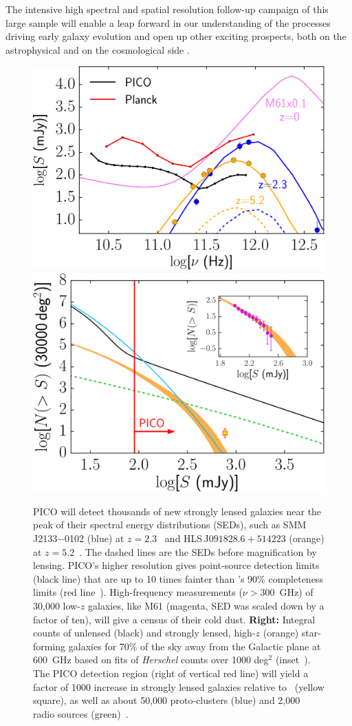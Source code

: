\documentclass[PICOReport.tex]{subfiles}
\begin{document}
The intensive high spectral and spatial resolution follow-up campaign of this large sample will enable a leap forward in our understanding of the processes driving early galaxy evolution and open up other exciting prospects, both on the astrophysical and on the cosmological side \cite[e.g.,][]{Treu2010}.
\begin{figure}[t]
\begin{center}
\includegraphics[width=0.416\columnwidth, trim={0 0 0 0cm}, clip]{images/fig_SED_PICO.pdf}
\hspace{0.75cm}
\includegraphics[width=0.4\columnwidth, trim={0 0 0 0cm}, clip]{images/NgtF_pico_NEWNEW.pdf}
\vskip-0.3cm
\caption{  PICO will detect thousands of new strongly lensed galaxies near the peak of their spectral energy distributions (SEDs), such as SMM\,J2133$-$0102 (blue)  at $z=2.3$~\cite{Swinbank2010} and HLS\,J$091828.6{+}514223$ (orange) at $z=5.2$~\cite{Combes2012}. The dashed lines are the SEDs before magnification by lensing. PICO's higher resolution gives point-source detection limits (black line) that are up to 10 times fainter than \planck 's 90\% completeness limits (red line~\cite{PCCS2}). High-frequency measurements ($\nu>300$~GHz) of 30,000 low-$z$ galaxies, like M61 (magenta, SED was scaled down by a factor of ten), will give a census of their cold dust.  {\bf Right:} Integral counts of unlensed (black) and strongly lensed, high-$z$ (orange) star-forming galaxies for 70\% of the sky away from the Galactic plane at 600~GHz based on fits of \textit{Herschel} counts over 1000 deg$^2$ (inset~\citep{Negrello2017lensed}). The PICO detection region (right of vertical red line) will yield a factor of 1000 increase in strongly lensed galaxies relative to \planck~(yellow square), as well as about 50,000 proto-clusters (blue) and 2,000 radio sources (green)~\citep{Negrello2017protocl}.}
\label{fig:SED3}
\end{center}
\vspace{-0.25in}
\end{figure}
\end{document}
